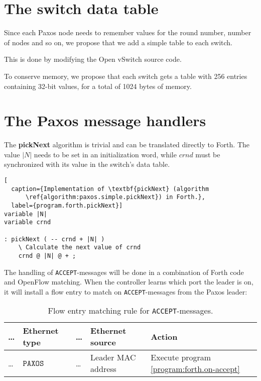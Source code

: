 \section{The switch data table}

Since each Paxos node needs to remember values for the round
number, number
of nodes and so on, we propose that we add a simple table to each switch.

This is done by modifying the Open vSwitch source code.

To conserve memory, we propose that each switch gets a table with 256
entries containing 32-bit values, for a total of 1024 bytes of memory.


\section{The Paxos message handlers}

The \textbf{pickNext} algorithm is trivial and can be translated directly to
Forth.  The value $|N|$ needs to be set in an initialization word,
while $crnd$ must be synchronized with its value in the switch's data table.

\begin{lstlisting}[
  caption={Implementation of \textbf{pickNext} (algorithm
      \ref{algorithm:paxos.simple.pickNext}) in Forth.},
  label={program.forth.pickNext}]
variable |N|
variable crnd

: pickNext ( -- crnd + |N| )
    \ Calculate the next value of crnd
    crnd @ |N| @ + ;
\end{lstlisting}

The handling of \texttt{ACCEPT}-messages will be done in a combination of
Forth code and OpenFlow matching.  When the controller learns which port the
leader is on, it will install a flow entry to match on
\texttt{ACCEPT}-messages from the Paxos
leader:

\begin{table}[H]
  \centering
  \begin{tabular}{l|l|l|l|l|}
    \hline
      \dots &
      \textbf{Ethernet type} &
      \dots &
      \textbf{Ethernet source} &
      \textbf{Action}
      \\
    \hline
      \dots &
      $\texttt{PAXOS ACCEPT}$
      & \dots
      & Leader MAC address
      & Execute program \ref{program:forth.on-accept}
      \\
    \hline
  \end{tabular}
  \caption{Flow entry matching rule for \texttt{ACCEPT}-messages.}
  \label{table:matching.simple.accept}
\end{table}

